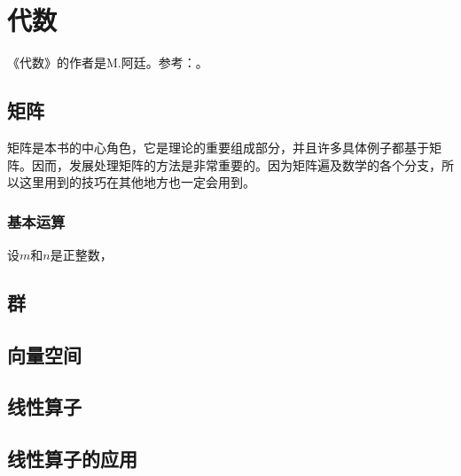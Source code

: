 \part{代数}
《代数》的作者是M.阿廷。参考：\cite{AlgebraArtin2015}。

\chapter{矩阵}\label{ch00601}
矩阵是本书的中心角色，它是理论的重要组成部分，并且许多具体例子都基于矩阵。因而，发展处理矩阵的方法是非常重要的。因为矩阵遍及数学的各个分支，所以这里用到的技巧在其他地方也一定会用到。

\section{基本运算}\label{sec0060101}
设$m$和$n$是正整数，


\chapter{群}\label{ch00602}


\chapter{向量空间}\label{ch00603}


\chapter{线性算子}\label{ch00604}


\chapter{线性算子的应用}\label{ch00605}










